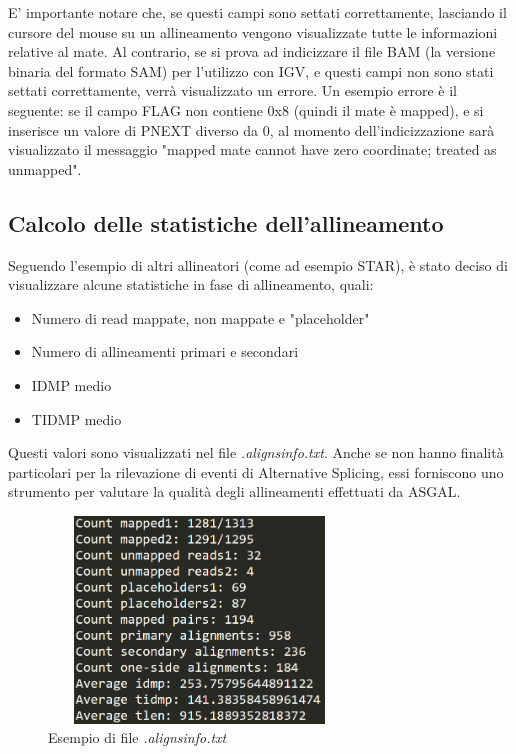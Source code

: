 \newpage

E' importante notare che, se questi campi sono settati correttamente, lasciando il cursore del mouse su un allineamento vengono visualizzate tutte le informazioni relative al mate. Al contrario, se si prova ad indicizzare il file BAM (la versione binaria del formato SAM) per l'utilizzo con IGV, e questi campi non sono stati settati correttamente, verrà visualizzato un errore. Un esempio errore è il seguente: se il campo FLAG non contiene 0x8 (quindi il mate è mapped), e si inserisce un valore di PNEXT diverso da 0, al momento dell'indicizzazione sarà visualizzato il messaggio "mapped mate cannot have zero coordinate; treated as unmapped".

\subsection{Calcolo delle statistiche dell'allineamento}
Seguendo l'esempio di altri allineatori (come ad esempio STAR), è stato deciso di visualizzare alcune statistiche in fase di allineamento, quali:

\begin{itemize}
	\item Numero di read mappate, non mappate e "placeholder"
	\item Numero di allineamenti primari e secondari
	\item IDMP medio
	\item TIDMP medio
\end{itemize}

Questi valori sono visualizzati nel file \textit{.alignsinfo.txt}. Anche se non hanno finalità particolari per la rilevazione di eventi di Alternative Splicing, essi forniscono uno strumento per valutare la qualità degli allineamenti effettuati da ASGAL.

\begin{figure}[h!]
	\centering
	\includegraphics[height=5.5cm,width=8cm]{images/aligninfo.png}
  \caption{Esempio di file \textit{.alignsinfo.txt}}
  \label{fig:AlignsInfo}
\end{figure}